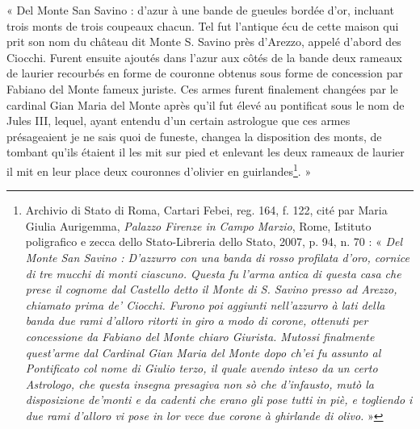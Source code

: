 \documentclass[12pt,twoside,openany]{book}
\renewenvironment{quote}
  {%
    \par\begingroup
    \fontsize{11pt}{14pt}\selectfont
    \list{}{\leftmargin=1.5em\rightmargin=1.5em}%
    \item\relax
  }
  {%
    \endlist
    \endgroup
  }
\newenvironment{PurhBlockQuote}
  {%
    \begin{quote}
  }
  {%
    \end{quote}
  }
\begin{document}
\begin{PurhBlockQuote}
« Del Monte San Savino : d’azur à une bande de gueules bordée d’or, incluant trois monts de trois coupeaux chacun. Tel fut l’antique écu de cette maison qui prit son nom du château dit Monte S. Savino près d’Arezzo, appelé d’abord des Ciocchi. Furent ensuite ajoutés dans l’azur aux côtés de la bande deux rameaux de laurier recourbés en forme de couronne obtenus sous forme de concession par Fabiano del Monte fameux juriste. Ces armes furent finalement changées par le cardinal Gian Maria del Monte après qu’il fut élevé au pontificat sous le nom de Jules III, lequel, ayant entendu d’un certain astrologue que ces armes présageaient je ne sais quoi de funeste, changea la disposition des monts, de tombant qu’ils étaient il les mit sur pied et enlevant les deux rameaux de laurier il mit en leur place deux couronnes d’olivier en guirlandes\footnote{Archivio di Stato di Roma, Cartari Febei, reg. 164, f. 122, cité par Maria Giulia Aurigemma, \textit{Palazzo Firenze in Campo Marzio}, Rome, Istituto poligrafico e zecca dello Stato-Libreria dello Stato, 2007, p. 94, n. 70 : « \textit{Del Monte San Savino : D’azzurro con una banda di rosso profilata d’oro, cornice di tre mucchi di monti ciascuno. Questa fu l’arma antica di questa casa che prese il cognome dal Castello detto il Monte di S. Savino presso ad Arezzo, chiamato prima de’ Ciocchi. Furono poi aggiunti nell’azzurro à lati della banda due rami d’alloro ritorti in giro a modo di corone, ottenuti per concessione da Fabiano del Monte chiaro Giurista. Mutossi finalmente quest’arme dal Cardinal Gian Maria del Monte dopo ch’ei fu assunto al Pontificato col nome di Giulio terzo, il quale avendo inteso da un certo Astrologo, che questa insegna presagiva non sò che d’infausto, mutò la disposizione de’monti e da cadenti che erano gli pose tutti in piè, e togliendo i due rami d’alloro vi pose in lor vece due corone à ghirlande di olivo.} »}. »
\end{PurhBlockQuote}
\end{document}

